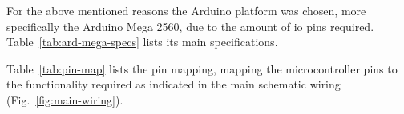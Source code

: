 For the above mentioned reasons the Arduino platform was chosen, more
specifically the Arduino Mega 2560, %
due to the amount of \gls{io} pins required. Table~\ref{tab:ard-mega-specs}
lists its main specifications.

Table~\ref{tab:pin-map} lists the pin mapping, mapping the
microcontroller pins to the functionality required as indicated in the main
schematic wiring (Fig.~\ref{fig:main-wiring}).
% 

\begin{table}[!hbt]
\centering
\caption{Arduino Mega 2560 main specifications}%
\label{tab:ard-mega-specs}
\end{table}

